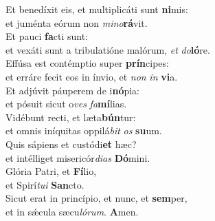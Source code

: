 \evenverse Et benedíxit eis, et multiplicáti sunt \textbf{ni}mis:~\*\\
\evenverse et juménta eórum non \textit{mi}\textit{no}\textbf{rá}vit.\\
\oddverse Et pauci \textbf{fa}cti sunt:~\*\\
\oddverse et vexáti sunt a tribulatióne malórum, \textit{et} \textit{do}\textbf{ló}re.\\
\evenverse Effúsa est contémptio super \textbf{prín}cipes:~\*\\
\evenverse et erráre fecit eos in ínvio, et \textit{non} \textit{in} \textbf{vi}a.\\
\oddverse Et adjúvit páuperem de i\textbf{nó}pia:~\*\\
\oddverse et pósuit sicut o\textit{ves} \textit{fa}\textbf{mí}lias.\\
\evenverse Vidébunt recti, et læta\textbf{bún}tur:~\*\\
\evenverse et omnis iníquitas oppilá\textit{bit} \textit{os} \textbf{su}um.\\
\oddverse Quis sápiens et custódi\textbf{et} hæc?~\*\\
\oddverse et intélliget misericór\textit{di}\textit{as} \textbf{Dó}mini.\\
\evenverse Glória Patri, et \textbf{Fí}lio,~\*\\
\evenverse et Spirí\textit{tu}\textit{i} \textbf{San}cto.\\
\oddverse Sicut erat in princípio, et nunc, et \textbf{sem}per,~\*\\
\oddverse et in sǽcula sæcu\textit{ló}\textit{rum}. \textbf{A}men.\\
